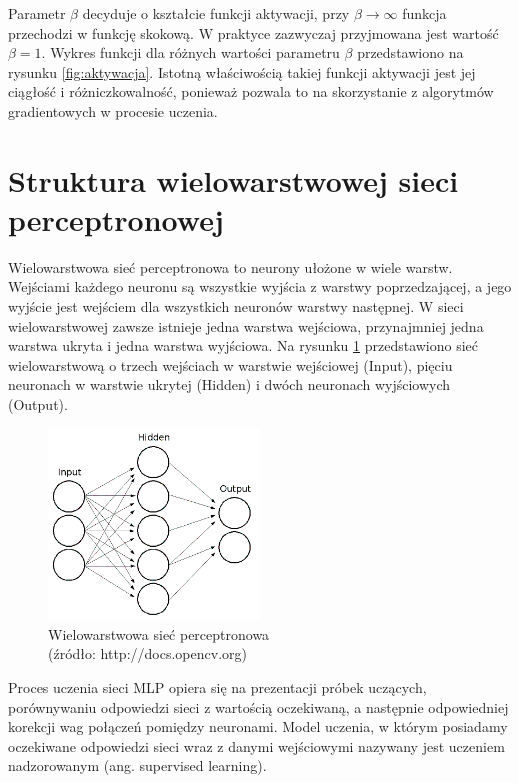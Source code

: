 Parametr $\beta$ decyduje o kształcie funkcji aktywacji, przy $\beta \rightarrow \infty$ funkcja przechodzi w funkcję skokową. W praktyce zazwyczaj przyjmowana jest wartość $\beta = 1$.\cite{osow01} Wykres funkcji dla różnych wartości parametru $\beta$ przedstawiono na rysunku \ref{fig:aktywacja}. Istotną właściwością takiej funkcji aktywacji jest jej ciągłość i różniczkowalność, ponieważ pozwala to na skorzystanie z algorytmów gradientowych w procesie uczenia.



\section{Struktura wielowarstwowej sieci perceptronowej}
\label{Sec:ThMLP}
Wielowarstwowa sieć perceptronowa to neurony ułożone w wiele warstw. Wejściami każdego neuronu są wszystkie wyjścia z warstwy poprzedzającej, a jego wyjście jest wejściem dla wszystkich neuronów warstwy następnej. W sieci wielowarstwowej zawsze istnieje jedna warstwa wejściowa, przynajmniej jedna warstwa ukryta i jedna warstwa wyjściowa. Na rysunku \ref{fig:mlp02} przedstawiono sieć wielowarstwową o trzech wejściach w warstwie wejściowej (Input), pięciu neuronach w warstwie ukrytej (Hidden) i dwóch neuronach wyjściowych (Output).

\begin{figure}[H]
\begin{center}
\includegraphics[width=0.5\textwidth]{mlp02.png}
\caption{Wielowarstwowa sieć perceptronowa \\ (źródło: http://docs.opencv.org)}
\label{fig:mlp02}
\end{center}
\end{figure}

Proces uczenia sieci MLP opiera się na prezentacji próbek uczących, porównywaniu odpowiedzi sieci z wartością oczekiwaną, a następnie odpowiedniej korekcji wag połączeń pomiędzy neuronami. Model uczenia, w którym posiadamy oczekiwane odpowiedzi sieci wraz z danymi wejściowymi nazywany jest uczeniem nadzorowanym (ang. supervised learning). 




